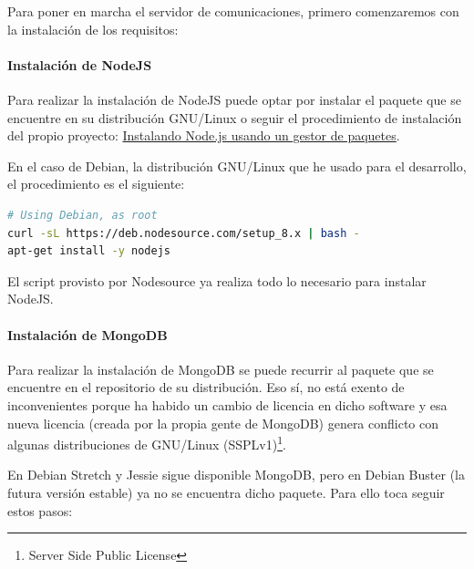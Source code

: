 \documentclass[spanish,12pt, a4paper, twoside]{paper}
\begin{document}
Para poner en marcha el servidor de comunicaciones, primero comenzaremos con la instalación de los requisitos:

\paragraph{Instalación de NodeJS}

Para realizar la instalación de NodeJS puede optar por instalar el paquete que se encuentre en su distribución GNU/Linux o seguir el procedimiento de instalación del propio proyecto: \href{https://nodejs.org/es/download/package-manager/}{Instalando Node.js usando un gestor de paquetes}.
\newline

En el caso de Debian, la distribución GNU/Linux que he usado para el desarrollo, el procedimiento es el siguiente:

\begin{lstlisting}[language=sh]
# Using Debian, as root
curl -sL https://deb.nodesource.com/setup_8.x | bash -
apt-get install -y nodejs
\end{lstlisting}

El script provisto por Nodesource ya realiza todo lo necesario para instalar NodeJS.

\paragraph{Instalación de MongoDB} Para realizar la instalación de MongoDB se puede recurrir al paquete que se encuentre en el repositorio de su distribución. Eso sí, no está exento de inconvenientes porque ha habido un cambio de licencia en dicho software y esa nueva licencia (creada por la propia gente de MongoDB) genera conflicto con algunas distribuciones de GNU/Linux (SSPLv1)\footnote{Server Side Public License}.

En Debian Stretch y Jessie sigue disponible MongoDB, pero en Debian Buster (la futura versión estable) ya no se encuentra dicho paquete. Para ello toca seguir estos pasos:
\end{document}
